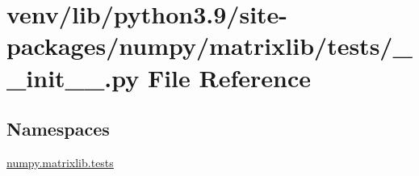 \hypertarget{venv_2lib_2python3_89_2site-packages_2numpy_2matrixlib_2tests_2____init_____8py}{}\section{venv/lib/python3.9/site-\/packages/numpy/matrixlib/tests/\+\_\+\+\_\+init\+\_\+\+\_\+.py File Reference}
\label{venv_2lib_2python3_89_2site-packages_2numpy_2matrixlib_2tests_2____init_____8py}
\subsection*{Namespaces}
\begin{DoxyCompactItemize}
\item 
 \hyperlink{namespacenumpy_1_1matrixlib_1_1tests}{numpy.\+matrixlib.\+tests}
\end{DoxyCompactItemize}
